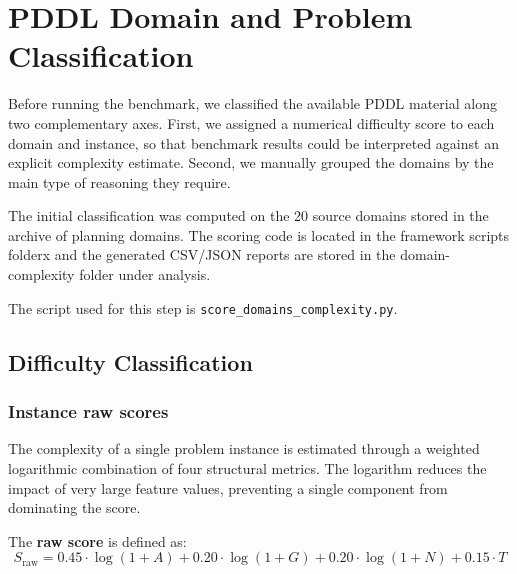 \section{PDDL Domain and Problem Classification}

Before running the benchmark, we classified the available PDDL material along two complementary axes. First, we assigned a numerical difficulty score to each domain and instance, so that benchmark results could be interpreted against an explicit complexity estimate. Second, we manually grouped the domains by the main type of reasoning they require.

The initial classification was computed on the 20 source domains stored in the archive of planning domains. The scoring code is located in the framework scripts folderx and the generated CSV/JSON reports are stored in the domain-complexity folder under analysis.

The script used for this step is \texttt{score\_domains\_complexity.py}.

\subsection{Difficulty Classification}

\subsubsection{Instance raw scores}

The complexity of a single problem instance is estimated through a weighted logarithmic combination of four structural metrics. The logarithm reduces the impact of very large feature values, preventing a single component from dominating the score.

The \textbf{raw score} is defined as:
\begin{equation}
    S_{\mathrm{raw}} = 0.45 \cdot \log(1 + A) + 0.20 \cdot \log(1 + G) + 0.20 \cdot \log(1 + N) + 0.15 \cdot T
\end{equation}

